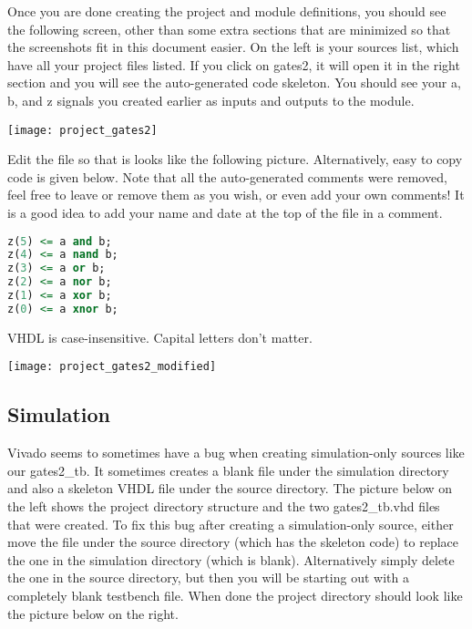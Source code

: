 Once you are done creating the project and module definitions, you should see the following
screen, other than some extra sections that are minimized so that the screenshots fit in this
document easier.
On the left is your sources list, which have all your project files listed.
If you click on gates2, it will open it in the right section and you will see the auto-generated
code skeleton.
You should see your a, b, and z signals you created earlier as inputs and outputs to the module.

\begin{center}
    \texttt{[image: project\_gates2]}
\end{center}

Edit the file so that is looks like the following picture.
Alternatively, easy to copy code is given below.
Note that all the auto-generated comments were removed, feel free to leave or remove them as
you wish, or even add your own comments! It is a good idea to add your name and date at the top
of the file in a comment.

\begin{lstlisting}[language=VHDL]
z(5) <= a and b;
z(4) <= a nand b;
z(3) <= a or b;
z(2) <= a nor b;
z(1) <= a xor b;
z(0) <= a xnor b;
\end{lstlisting}

\begin{mdframed}[style=note]
    VHDL is case-insensitive. Capital letters don't matter.
\end{mdframed}

\begin{center}
    \texttt{[image: project\_gates2\_modified]}
\end{center}

\subsection{Simulation}

Vivado seems to sometimes have a bug when creating simulation-only sources like our gates2\_tb.
It sometimes creates a blank file under the simulation directory and also a skeleton VHDL file
under the source directory.
The picture below on the left shows the project directory structure and the two gates2\_tb.vhd
files that were created.
To fix this bug after creating a simulation-only source, either move the file under the
source directory (which has the skeleton code) to replace the one in the simulation directory
(which is blank).
Alternatively simply delete the one in the source directory, but then you will be starting out
with a completely blank testbench file.
When done the project directory should look like the picture below on the right.

